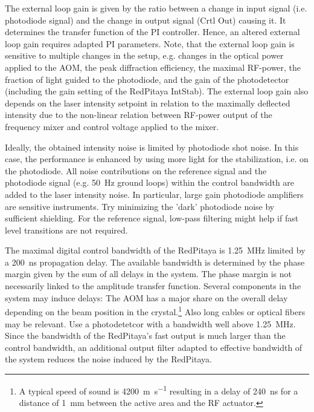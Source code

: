 \documentclass[twoside,a4paper]{refart}
\begin{document}
 
The external loop gain is given by the ratio between a change in input signal (i.e. photodiode signal) and the change in output signal (Crtl Out) causing it. It determines the transfer function of the PI controller. Hence, an altered external loop gain requires adapted PI parameters. Note, that the external loop gain is sensitive to multiple changes in the setup, e.g. changes in the optical power applied to the AOM, the peak diffraction efficiency, the maximal RF-power,  the fraction of light guided to the photodiode, and the gain of the photodetector (including the gain setting of the RedPitaya IntStab). The external loop gain also depends on the laser intensity setpoint in relation to the maximally deflected intensity due to the non-linear relation between RF-power output of the frequency mixer and control voltage applied to the mixer.

  

 
Ideally, the obtained intensity noise is limited by photodiode shot noise. In this case, the performance is enhanced by using more light for the stabilization, i.e. on the photodiode. All noise contributions on the reference signal and the photodiode signal (e.g. \SI{50}{\hertz} ground loops) within the control bandwidth are added to the laser intensity noise. In particular, large gain photodiode amplifiers are sensitive instruments. Try minimizing the 'dark' photodiode noise by sufficient shielding. For the reference signal, low-pass filtering might help if fast level transitions are not required.

 
The maximal digital control bandwidth of the RedPitaya is \SI{1.25}{\mega\hertz} limited by a \SI{200}{\nano\second} propagation delay. The available bandwidth is determined by the phase margin given by the sum of all delays in the system. The phase margin is not necessarily linked to the amplitude transfer function. Several components in the system may induce delays: The AOM has a major share on the overall delay depending on the beam position in the crystal.\footnote{A typical speed of sound is \SI{4200}{\meter\per\second} resulting in a delay of \SI{240}{\nano\second} for a distance of \SI{1}{\milli\meter} between the active area and the RF actuator.} Also long cables or optical fibers may be relevant. Use a photodetetcor with a bandwidth well above \SI{1.25}{\mega\hertz}. Since the bandwidth of the RedPitaya's fast output is much larger than the control bandwidth, an additional output filter adapted to effective bandwidth of the system reduces the noise induced by the RedPitaya. 
\end{document}
